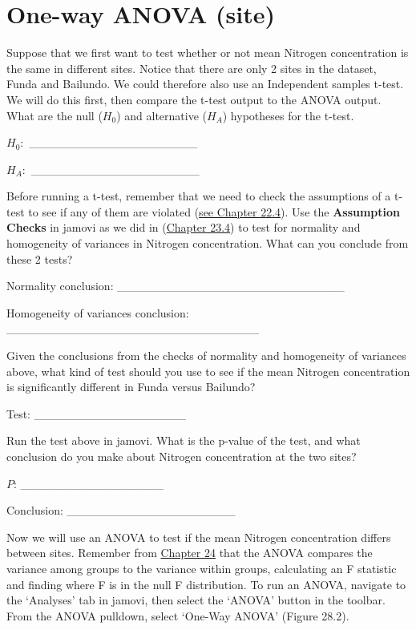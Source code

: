 \documentclass[
]{scrbook}
\begin{document}
\hypertarget{one-way-anova-site}{%
\section{One-way ANOVA (site)}\label{one-way-anova-site}}

Suppose that we first want to test whether or not mean Nitrogen concentration is the same in different sites.
Notice that there are only 2 sites in the dataset, Funda and Bailundo.
We could therefore also use an Independent samples t-test.
We will do this first, then compare the t-test output to the ANOVA output.
What are the null (\(H_{0}\)) and alternative (\(H_{A}\)) hypotheses for the t-test.

\(H_{0}:\) \_\_\_\_\_\_\_\_\_\_\_\_\_\_\_\_\_\_\_\_

\(H_{A}:\) \_\_\_\_\_\_\_\_\_\_\_\_\_\_\_\_\_\_\_\_

Before running a t-test, remember that we need to check the assumptions of a t-test to see if any of them are violated (\protect\hyperlink{assumptions-of-t-tests}{see Chapter 22.4}).
Use the \textbf{Assumption Checks} in jamovi as we did in (\protect\hyperlink{independent-samples-t-test-1}{Chapter 23.4}) to test for normality and homogeneity of variances in Nitrogen concentration.
What can you conclude from these 2 tests?

Normality conclusion: \_\_\_\_\_\_\_\_\_\_\_\_\_\_\_\_\_\_\_\_\_\_\_\_\_\_\_

Homogeneity of variances conclusion: \_\_\_\_\_\_\_\_\_\_\_\_\_\_\_\_\_\_\_\_\_\_\_\_\_\_\_\_\_\_

Given the conclusions from the checks of normality and homogeneity of variances above, what kind of test should you use to see if the mean Nitrogen concentration is significantly different in Funda versus Bailundo?

Test: \_\_\_\_\_\_\_\_\_\_\_\_\_\_\_\_\_\_

Run the test above in jamovi.
What is the p-value of the test, and what conclusion do you make about Nitrogen concentration at the two sites?

\(P\): \_\_\_\_\_\_\_\_\_\_\_\_\_\_\_\_\_

Conclusion: \_\_\_\_\_\_\_\_\_\_\_\_\_\_\_\_\_\_\_\_

Now we will use an ANOVA to test if the mean Nitrogen concentration differs between sites.
Remember from \protect\hyperlink{Chapter_24}{Chapter 24} that the ANOVA compares the variance among groups to the variance within groups, calculating an F statistic and finding where F is in the null F distribution.
To run an ANOVA, navigate to the `Analyses' tab in jamovi, then select the `ANOVA' button in the toolbar.
From the ANOVA pulldown, select `One-Way ANOVA' (Figure 28.2).
\end{document}
